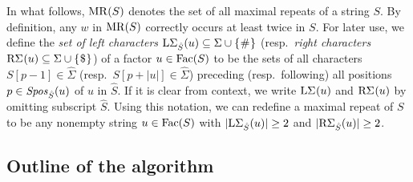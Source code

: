 In what follows, $\MR(S)$ denotes the set of all maximal repeats of a string $S$. By definition, any $w$ in $\MR(S)$ correctly occurs at least twice in $S$. 
For later use, we define the \textit{set of left characters} $\LSigma(u) \subseteq \Sigma\cup\set{\#}$ (resp.~\textit{right characters} $\RSigma[](u) \subseteq \Sigma\cup\set{\daller}$) of a factor $u \in \Fac(S)$ to be the sets of all characters $S[p-1] \in \hat\Sigma$ (resp.~$S[p+|u|] \in \hat\Sigma$) preceding (resp.~following) all positions $p\in \Spos(u)$ of $u$ in $\hat S$.
If it is clear from context, we write $\LSigma[](u)$ and $\RSigma[](u)$ by omitting subscript $\hat S$. 
Using this notation, we can redefine a maximal repeat of $S$ to be any nonempty string $u \in \Fac(S)$ with $|\LSigma(u)| \ge 2$ and $|\RSigma(u)| \ge 2$.




\subsection{Outline of the algorithm}
\label{sec:algo:tdsa}

